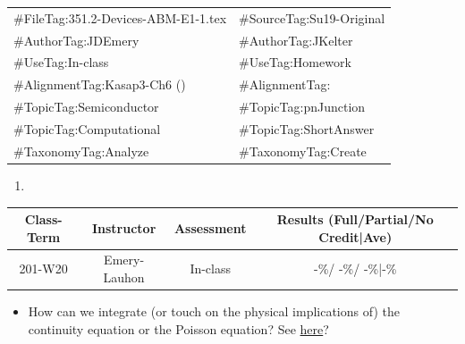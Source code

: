 \documentclass[12pt]{exam}
\begin{document}
\begin{FileID}
	\begin{center}
		\begin{tabular}{ll}
			\hline
			\hline
			\#FileTag:351.2-Devices-ABM-E1-1.tex & \#SourceTag:Su19-Original\\
			\#AuthorTag:JDEmery          & \#AuthorTag:JKelter \\
			\#UseTag:In-class            & \#UseTag:Homework \\
			\#AlignmentTag:Kasap3-Ch6 (\cite{Kasap:2005:PEM:1594045})    & \#AlignmentTag: \\
			\#TopicTag:Semiconductor     & \#TopicTag:pnJunction\\
			\#TopicTag:Computational     & \#TopicTag:ShortAnswer \\
			\#TaxonomyTag:Analyze        & \#TaxonomyTag:Create \\
			\hline
		\end{tabular}
	\end{center}
\end{FileID}

\begin{rubric}

\begin{enumerate}
	\item 
\end{enumerate}

\end{rubric}

\begin{outcomes}
	\begin{center}
		\begin{tabular}{cccc}
			\hline\hline
			Class-Term & Instructor & Assessment & Results (Full/Partial/No Credit|Ave)\\
			\hline
			201-W20 & Emery-Lauhon & In-class & -\%/ -\%/ -\%|-\%\\
			\hline
		\end{tabular}
	\end{center}
\end{outcomes}

\begin{comments}

\begin{itemize}
    \item How can we integrate (or touch on the physical implications of) the continuity equation or the Poisson equation? See \href{https://www.tf.uni-kiel.de/matwis/amat/semi_en/index.html}{here}?
\end{itemize}

\end{comments}

\newpage
\printbibliography
\end{document}
